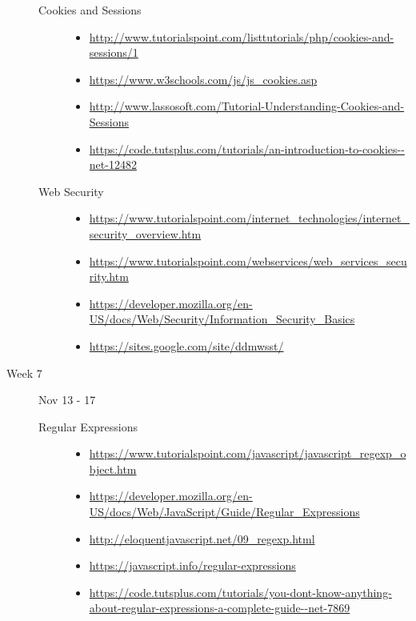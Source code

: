 \documentclass{article}
\begin{document}
\begin{description}
\begin{description}
\item[Cookies and Sessions]\mbox{}
  \begin{itemize}
  \item\scriptsize\url{http://www.tutorialspoint.com/listtutorials/php/cookies-and-sessions/1}
  \item\scriptsize\url{https://www.w3schools.com/js/js_cookies.asp}
  \item\scriptsize\url{http://www.lassosoft.com/Tutorial-Understanding-Cookies-and-Sessions}
  \item\scriptsize\url{https://code.tutsplus.com/tutorials/an-introduction-to-cookies--net-12482}
  \end{itemize}
  

\item[Web Security]\mbox{}
  \begin{itemize}
  \item\scriptsize\url{https://www.tutorialspoint.com/internet_technologies/internet_security_overview.htm}
  \item\scriptsize\url{https://www.tutorialspoint.com/webservices/web_services_security.htm}
  \item\scriptsize\url{https://developer.mozilla.org/en-US/docs/Web/Security/Information_Security_Basics    }
  \item\scriptsize\url{https://sites.google.com/site/ddmwsst/}
  \end{itemize}

  \end{description}
\item[Week 7]  Nov 13 - 17
  \begin{description}



  \item[Regular Expressions]\mbox{}
  \begin{itemize}
    \item\scriptsize\url{https://www.tutorialspoint.com/javascript/javascript_regexp_object.htm}
    \item\scriptsize\url{https://developer.mozilla.org/en-US/docs/Web/JavaScript/Guide/Regular_Expressions}
    \item\scriptsize\url{http://eloquentjavascript.net/09_regexp.html}
    \item\scriptsize\url{https://javascript.info/regular-expressions}
    \item\scriptsize\url{https://code.tutsplus.com/tutorials/you-dont-know-anything-about-regular-expressions-a-complete-guide--net-7869}
  \end{itemize}


\end{description}
\end{description}
\end{document}
